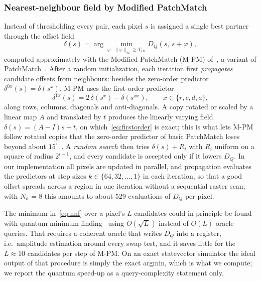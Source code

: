 \documentclass[conference]{IEEEtran}
\begin{document}
\subsubsection{Nearest-neighbour field by Modified PatchMatch}
Instead of thresholding every pair, each pixel $s$ is assigned a single best partner through the offset field
\begin{equation}
\delta(s) = \arg\min_{\varphi:\ \|\varphi\|_\infty \ge T_{D1}} D_Q\!\left(s,\, s+\varphi\right),
\label{eq:nnf}
\end{equation}
computed approximately with the Modified PatchMatch (M-PM) of~\cite{cozzolino2015}, a variant of PatchMatch~\cite{barnes2009}. After a random initialization, each iteration first \emph{propagates} candidate offsets from neighbours: besides the zero-order predictor $\delta^{0x}(s) = \delta(s^x)$, M-PM uses the first-order predictor
\begin{equation}
\delta^{1x}(s) = 2\,\delta(s^x) - \delta(s^{xx}), \qquad x\in\{r,c,d,a\},
\label{eq:firstorder}
\end{equation}
along rows, columns, diagonals and anti-diagonals. A copy rotated or scaled by a linear map $A$ and translated by $t$ produces the linearly varying field $\delta(s) = (A - I)s + t$, on which~\eqref{eq:firstorder} is exact; this is what lets M-PM follow rotated copies that the zero-order predictor of basic PatchMatch loses beyond about $15^\circ$~\cite{cozzolino2015}. A \emph{random search} then tries $\delta(s) + R_i$ with $R_i$ uniform on a square of radius $2^{i-1}$, and every candidate is accepted only if it lowers $D_Q$. In our implementation all pixels are updated in parallel, and propagation evaluates the predictors at step sizes $k\in\{64,32,\dots,1\}$ in each iteration, so that a good offset spreads across a region in one iteration without a sequential raster scan; with $N_{\mathrm{it}} = 8$ this amounts to about 529 evaluations of $D_Q$ per pixel.

The minimum in~\eqref{eq:nnf} over a pixel's $L$ candidates could in principle be found with quantum minimum finding~\cite{durr1996} using $O(\sqrt{L})$ instead of $O(L)$ oracle queries. That requires a coherent oracle that writes $D_Q$ into a register, i.e.\ amplitude estimation around every swap test, and it saves little for the $L\approx10$ candidates per step of M-PM. On an exact statevector simulator the ideal output of that procedure is simply the exact argmin, which is what we compute; we report the quantum speed-up as a query-complexity statement only.
\end{document}

